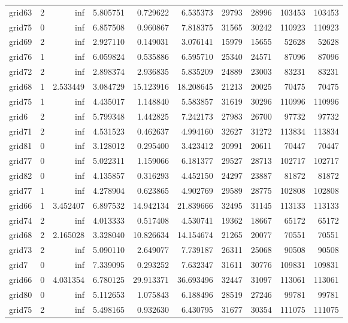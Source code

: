 \begin{longtable}{|l|r|r|r|r|r|r|r|r|r|}
grid63 & 2 & inf & 5.805751 & 0.729622 & 6.535373 & 29793 & 28996 & 103453 & 103453 \\
grid75 & 0 & inf & 6.857508 & 0.960867 & 7.818375 & 31565 & 30242 & 110923 & 110923 \\
grid69 & 2 & inf & 2.927110 & 0.149031 & 3.076141 & 15979 & 15655 & 52628 & 52628 \\
grid76 & 1 & inf & 6.059824 & 0.535886 & 6.595710 & 25340 & 24571 & 87096 & 87096 \\
grid72 & 2 & inf & 2.898374 & 2.936835 & 5.835209 & 24889 & 23003 & 83231 & 83231 \\
grid68 & 1 & 2.533449 & 3.084729 & 15.123916 & 18.208645 & 21213 & 20025 & 70475 & 70475 \\
grid75 & 1 & inf & 4.435017 & 1.148840 & 5.583857 & 31619 & 30296 & 110996 & 110996 \\
grid6 & 2 & inf & 5.799348 & 1.442825 & 7.242173 & 27983 & 26700 & 97732 & 97732 \\
grid71 & 2 & inf & 4.531523 & 0.462637 & 4.994160 & 32627 & 31272 & 113834 & 113834 \\
grid81 & 0 & inf & 3.128012 & 0.295400 & 3.423412 & 20991 & 20611 & 70447 & 70447 \\
grid77 & 0 & inf & 5.022311 & 1.159066 & 6.181377 & 29527 & 28713 & 102717 & 102717 \\
grid82 & 0 & inf & 4.135857 & 0.316293 & 4.452150 & 24297 & 23887 & 81872 & 81872 \\
grid77 & 1 & inf & 4.278904 & 0.623865 & 4.902769 & 29589 & 28775 & 102808 & 102808 \\
grid66 & 1 & 3.452407 & 6.897532 & 14.942134 & 21.839666 & 32495 & 31145 & 113133 & 113133 \\
grid74 & 2 & inf & 4.013333 & 0.517408 & 4.530741 & 19362 & 18667 & 65172 & 65172 \\
grid68 & 2 & 2.165028 & 3.328040 & 10.826634 & 14.154674 & 21265 & 20077 & 70551 & 70551 \\
grid73 & 2 & inf & 5.090110 & 2.649077 & 7.739187 & 26311 & 25068 & 90508 & 90508 \\
grid7 & 0 & inf & 7.339095 & 0.293252 & 7.632347 & 31611 & 30776 & 109831 & 109831 \\
grid66 & 0 & 4.031354 & 6.780125 & 29.913371 & 36.693496 & 32447 & 31097 & 113061 & 113061 \\
grid80 & 0 & inf & 5.112653 & 1.075843 & 6.188496 & 28519 & 27246 & 99781 & 99781 \\
grid75 & 2 & inf & 5.498165 & 0.932630 & 6.430795 & 31677 & 30354 & 111075 & 111075 \\

\end{longtable}
